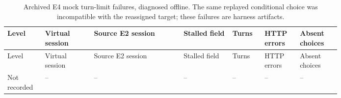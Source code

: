 \begingroup\small\setlength{\tabcolsep}{3pt}\renewcommand{\arraystretch}{1.15}
\begin{longtable}{>{\raggedright\arraybackslash}p{0.075\linewidth}>{\raggedright\arraybackslash}p{0.12\linewidth}>{\raggedright\arraybackslash}p{0.225\linewidth}>{\raggedright\arraybackslash}p{0.12\linewidth}>{\raggedright\arraybackslash}p{0.07\linewidth}>{\raggedright\arraybackslash}p{0.08\linewidth}>{\raggedright\arraybackslash}p{0.1\linewidth}}
\caption{Archived E4 mock turn-limit failures, diagnosed offline. The same replayed conditional choice was incompatible with the reassigned target; these failures are harness artifacts.}\label{sup:e4turnlimits}\\\hline
Level & Virtual session & Source E2 session & Stalled field & Turns & HTTP errors & Absent choices \\ \hline
\endfirsthead
\hline
Level & Virtual session & Source E2 session & Stalled field & Turns & HTTP errors & Absent choices \\ \hline
\endhead
\hline\endfoot
\hline\endlastfoot
Not recorded & -- & -- & -- & -- & -- & -- \\
\end{longtable}\endgroup
